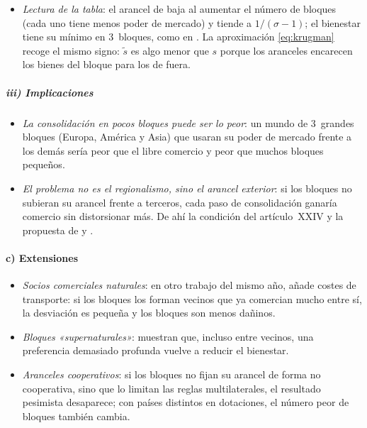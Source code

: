 \documentclass[11pt]{article}
\begin{document}
\begin{itemize}
\item \emph{Lectura de la tabla}: el arancel de  baja al aumentar el número de bloques (cada uno tiene menos poder de mercado) y tiende a $1/(\sigma-1)$; el bienestar tiene su mínimo en 3~bloques, como en \textcite{Krugman1991Bilateralism}. La aproximación \eqref{eq:krugman} recoge el mismo signo: $\tilde s$ es algo menor que $s$ porque los aranceles encarecen los bienes del bloque para los de fuera.
\end{itemize}

\subparagraph{iii) Implicaciones}

\begin{itemize}
\item \emph{La consolidación en pocos bloques puede ser lo peor}: un mundo de 3~grandes bloques (Europa, América y Asia) que usaran su poder de mercado frente a los demás sería peor que el libre comercio y peor que muchos bloques pequeños.
\item \emph{El problema no es el regionalismo, sino el arancel exterior}: si los bloques no subieran su arancel frente a terceros, cada paso de consolidación ganaría comercio sin distorsionar más. De ahí la condición del artículo~XXIV y la propuesta de  y .
\end{itemize}

\paragraph{c) Extensiones}

\begin{itemize}
\item \emph{Socios comerciales naturales}: en otro trabajo del mismo año, \textcite{Krugman1991Move} añade costes de transporte: si los bloques los forman vecinos que ya comercian mucho entre sí, la desviación es pequeña y los bloques son menos dañinos.
\item \emph{Bloques «supernaturales»}: \textcite{FrankelSteinWei1995} muestran que, incluso entre vecinos, una preferencia demasiado profunda vuelve a reducir el bienestar.
\item \emph{Aranceles cooperativos}: si los bloques no fijan su arancel de forma no cooperativa, sino que lo limitan las reglas multilaterales, el resultado pesimista desaparece\nocite{DeardorffStern1994}; con países distintos en dotaciones, el número peor de bloques también cambia\nocite{BondSyropoulos1996}.
\end{itemize}
\end{document}
